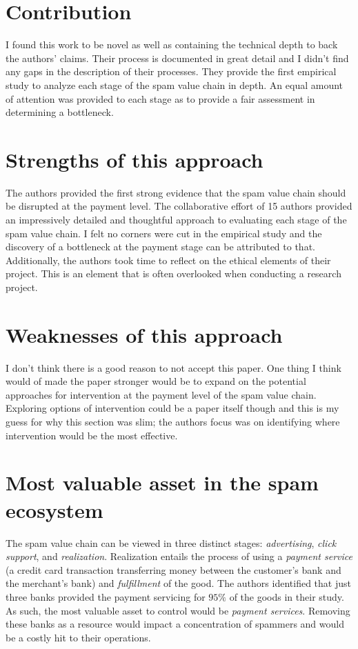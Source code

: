 \documentclass[fleqn,11pt]{wlpeerj} %
\begin{document}
\section*{Contribution}
I found this work to be novel as well as containing the technical depth to back the authors' claims. Their process is documented in great detail and I didn't find any gaps in the description of their processes. They provide the first empirical study to analyze each stage of the spam value chain in depth. An equal amount of attention was provided to each stage as to provide a fair assessment in determining a bottleneck.


\section*{Strengths of this approach}

The authors provided the first strong evidence that the spam value chain should be disrupted at the payment level. The collaborative effort of 15 authors provided an impressively detailed and thoughtful approach to evaluating each stage of the spam value chain. I felt no corners were cut in the empirical study and the discovery of a bottleneck at the payment stage can be attributed to that. Additionally, the authors took time to reflect on the ethical elements of their project. This is an element that is often overlooked when conducting a research project.

\section*{Weaknesses of this approach}

I don't think there is a good reason to not accept this paper. One thing I think would of made the paper stronger would be to expand on the potential approaches for intervention at the payment level of the spam value chain. Exploring options of intervention could be a paper itself though and this is my guess for why this section was slim; the authors focus was on identifying where intervention would be the most effective. 

\section*{Most valuable asset in the spam ecosystem}
The spam value chain can be viewed in three distinct stages: \textit{advertising}, \textit{click support}, and \textit{realization}. Realization entails the process of using a \textit{payment service} (a credit card transaction transferring money between the customer's bank and the merchant's bank) and \textit{fulfillment} of the good. The authors identified that just three banks provided the payment servicing for $95\%$ of the goods in their study. As such, the most valuable asset to control would be \textit{payment services}. Removing these banks as a resource would impact a concentration of spammers and would be a costly hit to their operations. 
\end{document}
